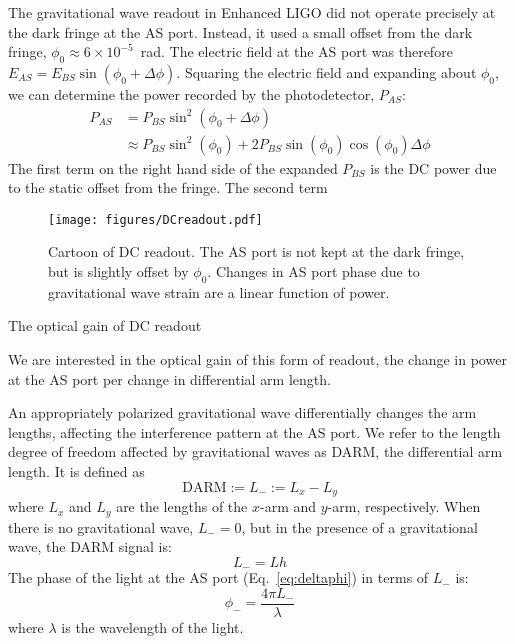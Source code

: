 The gravitational wave readout in Enhanced LIGO did not operate
precisely at the dark fringe at the AS port. Instead, it used a small offset
from the dark fringe, $\phi_0 \approx 6 \times 10^{-5}$~rad.
The electric field at the AS port was therefore $E_{AS} =
E_{BS}\sin{(\phi_0 + \Delta\phi)}$. Squaring the electric field and
expanding about $\phi_0$, we can determine the power recorded by the
photodetector, $P_{AS}$:
\begin{align}
P_{AS} &= P_{BS} \sin^2{(\phi_0 + \Delta\phi)} \\
 &\approx P_{BS}\sin^2{(\phi_0)} + 2P_{BS}\sin{(\phi_0)}\cos{(\phi_0)}\Delta\phi
\end{align}
The first term on the right hand side of the expanded $P_{BS}$ is the
DC power due to the static offset from the fringe. The second term


\begin{figure}
\begin{centering}
\texttt{[image: figures/DCreadout.pdf]}
\caption[Cartoon of DC readout]{Cartoon of DC readout. The AS port is
  not kept at the dark fringe, but is slightly offset by
  $\phi_0$. Changes in AS port phase due to gravitational wave strain
  are a linear function of power.}
\label{fig:DCreadout}
\end{centering}
\end{figure}



The optical gain of DC readout 

We are interested in the optical gain
of this form of readout, the change in power at the AS port per change
in differential arm length.




An appropriately polarized gravitational wave differentially changes
the arm lengths, affecting the interference pattern at the AS port. We
refer to the length degree of freedom affected by gravitational waves
as DARM, the differential arm length. It is defined as
\begin{equation}
\mathrm{DARM} := L_- := L_x - L_y
\end{equation}
where $L_x$ and $L_y$ are the lengths of the $x$-arm and $y$-arm,
respectively. When there is no gravitational wave, $L_-=0$, but in the
presence of a gravitational wave, the DARM signal is:
\begin{equation}
L_- = Lh
\end{equation}
The phase of the light at the AS port (Eq.~\ref{eq:deltaphi}) in terms
of $L_-$ is:
\begin{equation}
\phi_- = \frac{4 \pi L_-}{\lambda}
\end{equation}
where $\lambda$ is the wavelength of the light.





